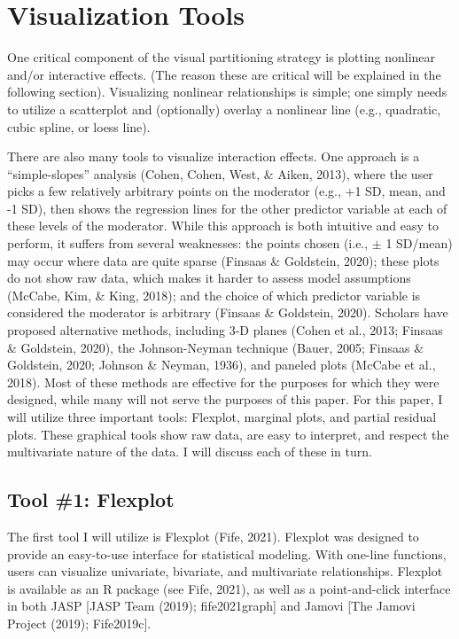 \documentclass[
  man,floatsintext]{apa6}
\begin{document}
\section{Visualization Tools}\label{visualization-tools}

One critical component of the visual partitioning strategy is plotting nonlinear and/or interactive effects. (The reason these are critical will be explained in the following section). Visualizing nonlinear relationships is simple; one simply needs to utilize a scatterplot and (optionally) overlay a nonlinear line (e.g., quadratic, cubic spline, or loess line).

There are also many tools to visualize interaction effects. One approach is a ``simple-slopes'' analysis (Cohen, Cohen, West, \& Aiken, 2013), where the user picks a few relatively arbitrary points on the moderator (e.g., +1 SD, mean, and -1 SD), then shows the regression lines for the other predictor variable at each of these levels of the moderator. While this approach is both intuitive and easy to perform, it suffers from several weaknesses: the points chosen (i.e., \(\pm\) 1 SD/mean) may occur where data are quite sparse (Finsaas \& Goldstein, 2020); these plots do not show raw data, which makes it harder to assess model assumptions (McCabe, Kim, \& King, 2018); and the choice of which predictor variable is considered the moderator is arbitrary (Finsaas \& Goldstein, 2020). Scholars have proposed alternative methods, including 3-D planes (Cohen et al., 2013; Finsaas \& Goldstein, 2020), the Johnson-Neyman technique (Bauer, 2005; Finsaas \& Goldstein, 2020; Johnson \& Neyman, 1936), and paneled plots (McCabe et al., 2018). Most of these methods are effective for the purposes for which they were designed, while many will not serve the purposes of this paper. For this paper, I will utilize three important tools: Flexplot, marginal plots, and partial residual plots. These graphical tools show raw data, are easy to interpret, and respect the multivariate nature of the data. I will discuss each of these in turn.

\subsection{Tool \#1: Flexplot}\label{tool-1-flexplot}

The first tool I will utilize is Flexplot (Fife, 2021). Flexplot was designed to provide an easy-to-use interface for statistical modeling. With one-line functions, users can visualize univariate, bivariate, and multivariate relationships. Flexplot is available as an R package (see Fife, 2021), as well as a point-and-click interface in both JASP {[}JASP Team (2019); fife2021graph{]} and Jamovi {[}The Jamovi Project (2019); Fife2019c{]}.
\end{document}
